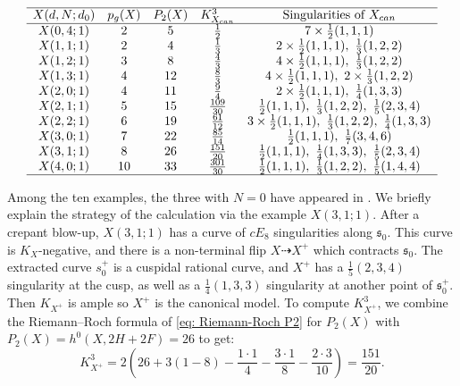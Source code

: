\documentclass[a4paper,11pt]{amsart}
\newcommand{\s}{\ensuremath{\mathfrak{s}}}
\theoremstyle{definition}
\theoremstyle{remark}
\numberwithin{equation}{section}
\begin{document}
\renewcommand{\arraystretch}{1.2}
\begin{table}[ht] \caption{$X(d,N;d_0)$ of general type with $K_X$ not nef}\label{tab: K not nef}
    $$
    \begin{array}{ccccc}
    \hline
    X(d,N;d_0) & p_g(X) & P_2(X) & K_{X_{\textrm{can}}}^3 & \text{Singularities of }X_{\textrm{can}} \\
    \hline
    X(0,4;1) & 2 & 5 & \frac12 & 7 \times \frac12(1,1,1) \\
    X(1,1;1) & 2 & 4 & \frac13 & 2 \times \frac12(1,1,1),\ \frac13(1,2,2) \\
    X(1,2;1) & 3 & 8 & \frac43 & 4 \times \frac12(1,1,1),\ \frac13(1,2,2) \\
    X(1,3;1) & 4 & 12 & \frac83 & 4\times\frac12(1,1,1),\ 2\times\frac13(1,2,2) \\
    X(2,0;1) & 4 & 11 & \frac94 & 2\times\frac12(1,1,1),\ \frac14(1,3,3) \\
    X(2,1;1) & 5 & 15 & \frac{109}{30} & \frac12(1,1,1),\ \frac13(1,2,2),\ \frac15(2,3,4) \\
    X(2,2;1) & 6 & 19 & \frac{61}{12} & 3\times\frac12(1,1,1),\ \frac13(1,2,2),\ \frac14(1,3,3) \\
    X(3,0;1) & 7 & 22 & \frac{85}{14} & \frac12(1,1,1),\ \frac17(3,4,6) \\
    X(3,1;1) & 8 & 26 & \frac{151}{20} & \frac12(1,1,1),\ \frac14(1,3,3),\ \frac15(2,3,4) \\
    X(4,0;1) & 10 & 33 & \frac{301}{30} & \frac12(1,1,1),\ \frac13(1,2,2),\ \frac15(1,4,4) \\
    \hline
    \end{array}
    $$
\end{table}

Among the ten examples, the three with $N=0$ have appeared in \cite[Proposition 6.1]{CP}. We briefly explain the strategy of the calculation via the example $X(3,1;1)$. After a crepant blow-up, $X(3,1;1)$ has a curve of $cE_8$ singularities along $\s_0$. This curve is $K_X$-negative, and there is a non-terminal flip $X \dashrightarrow X^+$ which contracts $\s_0$. The extracted curve $s_0^+$ is a cuspidal rational curve, and $X^+$ has a $\frac15(2,3,4)$ singularity at the cusp, as well as a $\frac14(1,3,3)$ singularity at another point of $\s_0^+$. Then $K_{X^+}$ is ample so $X^+$ is the canonical model. To compute $K_{X^+}^3$, we combine the Riemann--Roch formula of \eqref{eq: Riemann-Roch P2} for $P_2(X)$ with $P_2(X)=h^0(X, 2H+2F)=26$ to get:
$$
K_{X^+}^3 = 2\left(26+3(1-8) - \frac{1\cdot1}{4} - \frac{3\cdot1}{8} - \frac{2 \cdot 3}{10} \right) = \frac{151}{20}.
$$
\end{document}
